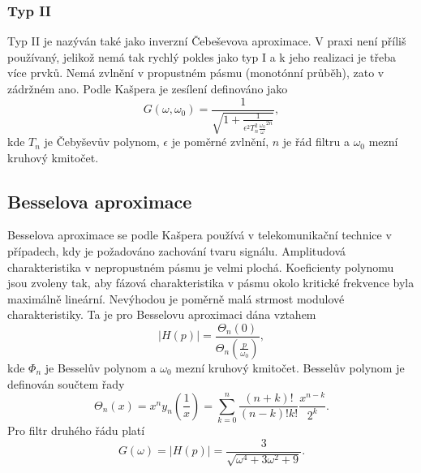 \subsubsection{Typ II}
Typ II je nazýván také jako inverzní Čebeševova aproximace. V praxi není příliš používaný, jelikož nemá tak rychlý pokles jako typ I a k jeho realizaci je třeba více prvků. Nemá zvlnění v propustném pásmu (monotónní průběh), zato v zádržném ano. Podle Kašpera \cite{7} je zesílení definováno jako
\begin{equation}
G(\omega, \omega _0) = \frac{1}{\sqrt{1 + \frac{1}{\epsilon ^2 T_n ^2 \frac{\omega _0}{\omega}^{2n}}}},
\end{equation}
kde $T_n$ je Čebyševův polynom, $\epsilon$ je poměrné zvlnění, $n$ je řád filtru a $\omega _0$ mezní kruhový kmitočet.
\subsection{Besselova aproximace}
Besselova aproximace se podle Kašpera \cite{7} používá v telekomunikační technice v případech, kdy je požadováno zachování tvaru signálu. Amplitudová charakteristika v nepropustném pásmu je velmi plochá. Koeficienty polynomu jsou zvoleny tak, aby fázová charakteristika v pásmu okolo kritické frekvence byla maximálně lineární. Nevýhodou je poměrně malá strmost modulové charakteristiky. Ta je pro Besselovu aproximaci dána vztahem
\begin{equation}
|H(p)| = \frac{\Theta _n(0)}{\Theta _n(\frac{p}{\omega _0})},
\end{equation}
kde $\Phi _n$ je Besselův polynom a $\omega _0$ mezní kruhový kmitočet. Besselův polynom je definován součtem řady
\begin{equation}
\Theta _n (x) = x^n y_n (\frac{1}{x}) = \sum_{k=0}^{n}\frac{(n+k)!}{(n-k)!k!}\frac{x^{n-k}}{2^k}.
\end{equation}
Pro filtr druhého řádu platí
\begin{equation}
G(\omega) = |H(p)| = \frac{3}{\sqrt{\omega ^4 + 3\omega ^2 + 9}}.
\end{equation}

